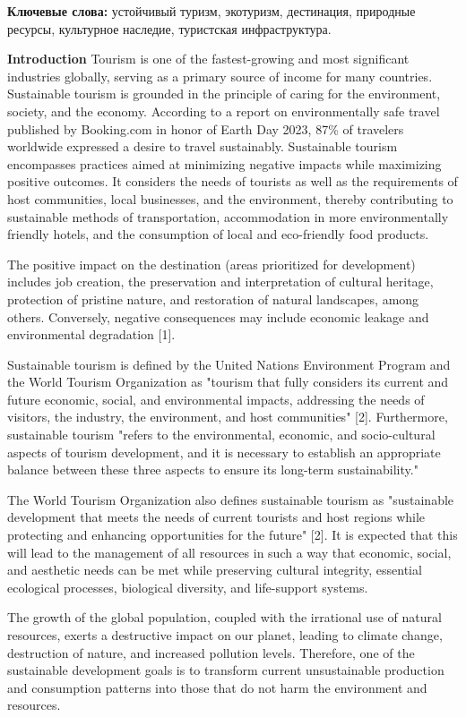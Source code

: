 {\bfseries Ключевые слова:} устойчивый туризм, экотуризм, дестинация,
природные ресурсы, культурное наследие, туристская инфраструктура.

{\bfseries Introduction} Tourism is one of the fastest-growing and most
significant industries globally, serving as a primary source of income
for many countries. Sustainable tourism is grounded in the principle of
caring for the environment, society, and the economy. According to a
report on environmentally safe travel published by Booking.com in honor
of Earth Day 2023, 87\% of travelers worldwide expressed a desire to
travel sustainably. Sustainable tourism encompasses practices aimed at
minimizing negative impacts while maximizing positive outcomes. It
considers the needs of tourists as well as the requirements of host
communities, local businesses, and the environment, thereby contributing
to sustainable methods of transportation, accommodation in more
environmentally friendly hotels, and the consumption of local and
eco-friendly food products.

The positive impact on the destination (areas prioritized for
development) includes job creation, the preservation and interpretation
of cultural heritage, protection of pristine nature, and restoration of
natural landscapes, among others. Conversely, negative consequences may
include economic leakage and environmental degradation {[}1{]}.

Sustainable tourism is defined by the United Nations Environment Program
and the World Tourism Organization as "tourism that fully considers its
current and future economic, social, and environmental impacts,
addressing the needs of visitors, the industry, the environment, and
host communities" {[}2{]}. Furthermore, sustainable tourism "refers to
the environmental, economic, and socio-cultural aspects of tourism
development, and it is necessary to establish an appropriate balance
between these three aspects to ensure its long-term sustainability."

The World Tourism Organization also defines sustainable tourism as
"sustainable development that meets the needs of current tourists and
host regions while protecting and enhancing opportunities for the
future" {[}2{]}. It is expected that this will lead to the management of
all resources in such a way that economic, social, and aesthetic needs
can be met while preserving cultural integrity, essential ecological
processes, biological diversity, and life-support systems.

The growth of the global population, coupled with the irrational use of
natural resources, exerts a destructive impact on our planet, leading to
climate change, destruction of nature, and increased pollution levels.
Therefore, one of the sustainable development goals is to transform
current unsustainable production and consumption patterns into those
that do not harm the environment and resources.

